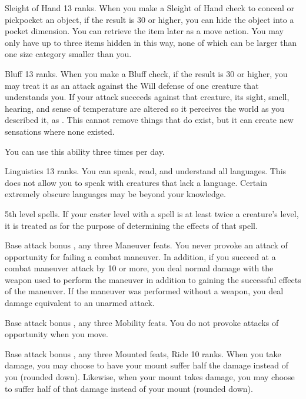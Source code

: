 \featpre Sleight of Hand 13 ranks.
\featben When you make a Sleight of Hand check to conceal or pickpocket an object, if the result is 30 or higher, you can hide the object into a pocket dimension. You can retrieve the item later as a move action. You may only have up to three items hidden in this way, none of which can be larger than one size category smaller than you.

\featpre Bluff 13 ranks.
\featben When you make a Bluff check, if the result is 30 or higher, you may treat it as an attack against the Will defense of one creature that understands you. If your attack succeeds against that creature, its sight, smell, hearing, and sense of temperature are altered so it perceives the world as you described it, as . This cannot remove things that do exist, but it can create new sensations where none existed.

You can use this ability three times per day.

\featpre Linguistics 13 ranks.
\featben You can speak, read, and understand all languages. This does not allow you to speak with creatures that lack a language. Certain extremely obscure languages may be beyond your knowledge.

\featpre 5th level spells.
\featben If your caster level with a spell is at least twice a creature's level, it is treated as \bloodied for the purpose of determining the effects of that spell.

\featpre Base attack bonus , any three Maneuver feats.
\featben You never provoke an attack of opportunity for failing a combat maneuver. In addition, if you succeed at a combat maneuver attack by 10 or more, you deal normal damage with the weapon used to perform the maneuver in addition to gaining the successful effects of the maneuver. If the maneuver was performed without a weapon, you deal damage equivalent to an unarmed attack.

\featpre Base attack bonus , any three Mobility feats.
\featben You do not provoke attacks of opportunity when you move.

\featpre Base attack bonus , any three Mounted feats, Ride 10 ranks.
\featben When you take damage, you may choose to have your mount suffer half the damage instead of you (rounded down). Likewise, when your mount takes damage, you may choose to suffer half of that damage instead of your mount (rounded down).

